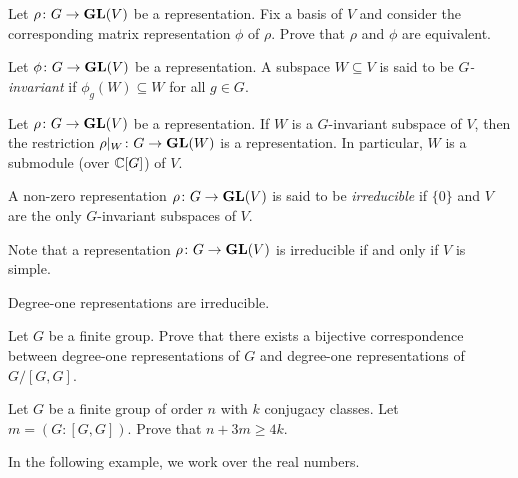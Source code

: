\begin{exercise}
    Let $\rho\colon G\to\mathbf{GL}(V)$ be a representation. Fix a basis 
    of $V$ and consider the corresponding matrix representation $\phi$ 
    of $\rho$. Prove that $\rho$ and $\phi$ are equivalent. 
\end{exercise}

\begin{definition}
    Let $\phi\colon G\to\mathbf{GL}(V)$ be a representation. A subspace 
    $W\subseteq V$ is said to be \emph{$G$-invariant} if
    $\phi_g(W)\subseteq W$ for all $g\in G$.  
\end{definition}

Let $\rho\colon G\to\mathbf{GL}(V)$ be a representation. 
If $W$ is a $G$-invariant subspace of $V$, 
then the restriction $\rho|_W\colon G\to\mathbf{GL}(W)$
is a representation. In particular, $W$ is a submodule (over $\mathbb{C}[G]$) 
of $V$. 

\begin{definition}
    A non-zero representation $\rho\colon G\to\mathbf{GL}(V)$ is 
    said to be \emph{irreducible} if 
    $\{0\}$ and $V$ are the only 
    $G$-invariant subspaces of $V$. 
\end{definition}

Note that a representation $\rho\colon G\to\mathbf{GL}(V)$ is irreducible
if and only if $V$ is simple. 

\begin{example}
    Degree-one representations are irreducible. 
\end{example}

\begin{exercise}
\label{xca:degree-one}
    Let $G$ be a finite group. 
    Prove that there exists a bijective correspondence between 
    degree-one representations of $G$ and 
    degree-one representations of $G/[G,G]$. 
\end{exercise}

\begin{exercise}
\label{xca:inequality}
    Let $G$ be a finite group of order $n$ with $k$ conjugacy classes.
    Let $m=(G:[G,G])$. Prove that $n+3m\geq4k$. 
\end{exercise}

In the following example, we work over the real numbers. 


